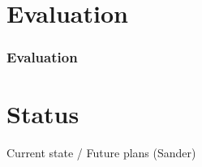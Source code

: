 \documentclass[11pt,a4paper,xcolor=dvipsnames]{beamer}
\begin{document}
\section{Evaluation}
\begin{frame} %
\frametitle{Evaluation}
\end{frame}

\section{Status}
\begin{frame}
  Current state / Future plans (Sander)
\end{frame}
\end{document}
